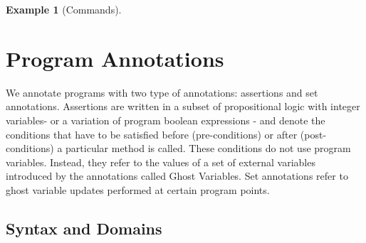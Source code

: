 \documentclass[10pt,notitlepage,twoside]{article}
\newtheorem{example}{Example}
\begin{document}
\begin{example}[Commands] \end{example}


\section{Program Annotations}

We annotate programs with two type of annotations: assertions and set annotations.
Assertions are written in a subset of propositional logic with integer variables- or a variation of program boolean expressions -  and denote the conditions that have to be satisfied before (pre-conditions) or after (post-conditions) a particular method is called.
These conditions do not use program variables. Instead,  they refer to the values of a set of external variables introduced by the annotations called Ghost Variables. 
Set annotations refer to ghost variable updates performed at certain program points.


\subsection{Syntax and Domains}
\end{document}
